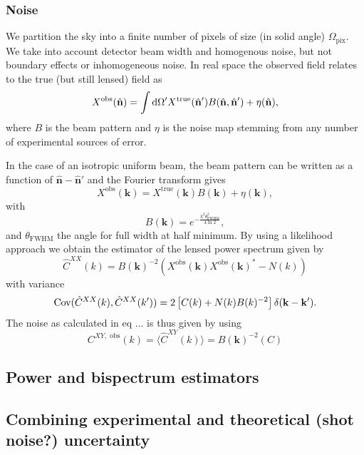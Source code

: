 \documentclass[11pt]{article} %
\DeclareRobustCommand{\d}{\ifmmode\text{d}\else d\fi}
\DeclareRobustCommand{\Cov}{\ifmmode\text{Cov}\else d\fi}
\newcommand{\br}[1]{\ensuremath{\left( #1 \right)}}
\newcommand{\sbr}[1]{\ensuremath{\left[ #1 \right]}}
\begin{document}
\subsubsection{Noise}
We partition the sky into a finite number of pixels of size (in solid angle) $\Omega_{\text{pix}}$. We take into account detector beam width and homogenous noise, but not boundary effects or inhomogeneous noise. %
In real space the observed field relates to the true (but still lensed) field as
\begin{equation*}
    X^{\text{obs}}(\hat{\mathbf n}) = \int \d\Omega' X^{\text{true}}(\hat{\mathbf n}') B(\hat{\mathbf n}, \hat{\mathbf n}') + \eta(\hat{\mathbf n}),
\end{equation*}
where $B$ is the beam pattern and $\eta$ is the noise map stemming from any number of experimental sources of error.

In the case of an isotropic uniform beam, the beam pattern can be written as a function of $\hat{\mathbf n} - \hat{\mathbf n}'$ and the Fourier transform gives 
\begin{equation*}
    X^{\text{obs}}(\mathbf k) = X^{\text{true}}(\mathbf k)B(\mathbf k) + \eta(\mathbf k),
\end{equation*}
with
\begin{equation*}
    B(\mathbf k) = e^{-\frac{k^2\theta_{\text{FWHM}}^2}{4\ln 2}},
\end{equation*}
and $\theta_{\text{FWHM}}$ the angle for full width at half minimum.
By using a likelihood approach we obtain the estimator of the lensed power spectrum given by
\begin{equation*}
    \hat C^{XX}(k) = B(\mathbf k)^{-2}\br{X^{\text{obs}}(\mathbf k)X^{\text{obs}}(\mathbf k)^* - N(k)}
\end{equation*}
with variance
\begin{equation*}
    \Cov(\hat C^{XX}(k), \hat C^{XX}(k')) = 2\sbr{C(k) + N(k)B(k)^{-2}}\delta(\mathbf k - \mathbf k').
\end{equation*}
The noise as calculated in eq ... %
is thus given by using
\begin{equation*}
    C^{XY, \text{ obs}}(k) = \langle \hat C^{XY}(k) \rangle = B(\mathbf k)^{-2}(C)
\end{equation*}
\subsection{Power and bispectrum estimators}
\subsection{Combining experimental and theoretical (shot noise?) uncertainty}
\end{document}
